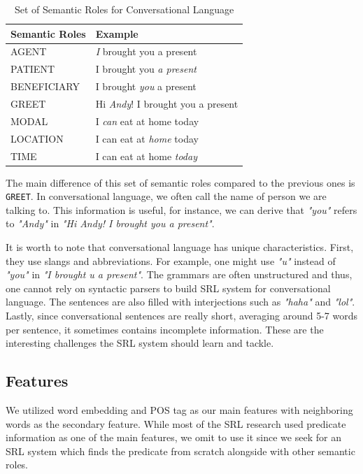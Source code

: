\begin{table}
	\caption{Set of Semantic Roles for Conversational Language}
	\label{tab:semantic_roles}
	\begin{tabular}{ll}
		\toprule
		Semantic Roles		&Example\\
		\midrule
		AGENT				& \emph{I} brought you a present\\
		PATIENT				& I brought you \emph{a present}\\
		BENEFICIARY			& I brought \emph{you} a present\\
		GREET 				& Hi \emph{Andy}! I brought you a present\\
		MODAL 				& I \emph{can} eat at home today \\
		LOCATION 			& I can eat at \emph{home} today \\
		TIME 				& I can eat at home \emph{today} \\
		\bottomrule
	\end{tabular}
\end{table}

The main difference of this set of semantic roles compared to the previous ones is \texttt{GREET}. In conversational language, we often call the name of person we are talking to. This information is useful, for instance, we can derive that \textit{"you"} refers to \textit{"Andy"} in \textit{"Hi Andy! I brought you a present"}.

It is worth to note that conversational language has unique characteristics. First, they use slangs and abbreviations. For example, one might use \textit{"u"} instead of \textit{"you"} in \textit{"I brought u a present"}. The grammars are often unstructured and thus, one cannot rely on syntactic parsers to build SRL system for conversational language. The sentences are also filled with interjections such as \textit{"haha"} and \textit{"lol"}. Lastly, since conversational sentences are really short, averaging around 5-7 words per sentence, it sometimes contains incomplete information. These are the interesting challenges the SRL system should learn and tackle.

\subsection{Features}
We utilized word embedding and POS tag as our main features with neighboring words as the secondary feature. While most of the SRL research used predicate information as one of the main features, we omit to use it since we seek for an SRL system which finds the predicate from scratch alongside with other semantic roles.

